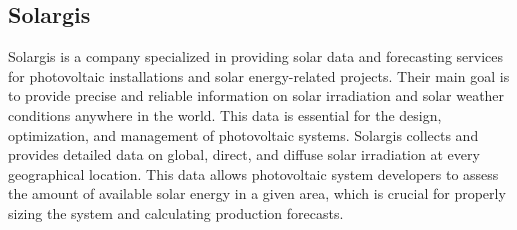 \subsection{Solargis} \label{sec:solargis}
Solargis is a company specialized in providing solar data and forecasting services for photovoltaic
installations and solar energy-related projects\cite{solargis}. Their main goal is to provide precise and
reliable information on solar irradiation and solar weather conditions anywhere in the world.
This data is essential for the design, optimization, and management of photovoltaic systems.
Solargis collects and provides detailed data on global, direct, and diffuse solar irradiation at
every geographical location\cite{solargis}. This data allows photovoltaic system developers to assess the
amount of available solar energy in a given area, which is crucial for properly sizing the
system and calculating production forecasts.


